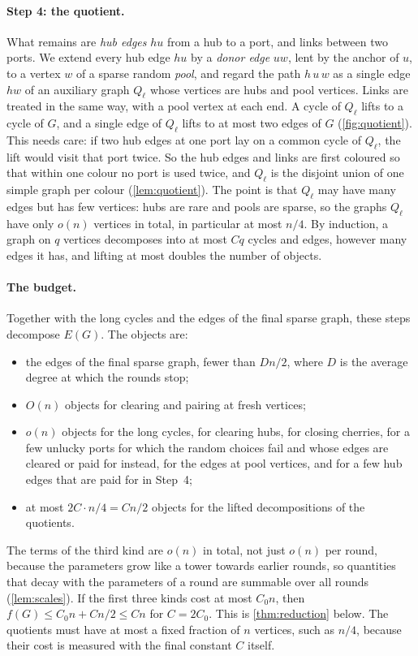 \documentclass[11pt]{article}
\theoremstyle{definition}
\theoremstyle{remark}
\numberwithin{equation}{section}
\numberwithin{figure}{section}
\numberwithin{table}{section}
\begin{document}
\paragraph{Step 4: the quotient.} What remains are \emph{hub edges} $hu$ from a
hub to a port, and links between two ports. We extend every hub edge $hu$ by a
\emph{donor edge} $uw$, lent by the anchor of $u$, to a vertex $w$ of a sparse random
\emph{pool}, and regard the path $h\,u\,w$ as a single edge $hw$ of an auxiliary
graph $Q_\ell$ whose vertices are hubs and pool vertices. Links are treated in
the same way, with a pool vertex at each end. A cycle of $Q_\ell$ lifts to a
cycle of $G$, and a single edge of $Q_\ell$ lifts to at most two edges of $G$
(\cref{fig:quotient}). This needs care: if two hub edges at one port lay on a
common cycle of $Q_\ell$, the lift would visit that port twice. So the hub
edges and links are first coloured so that within one colour no port is used
twice, and $Q_\ell$ is the disjoint union of one simple graph per colour
(\cref{lem:quotient}). The point is that $Q_\ell$ may have many edges but has
few vertices: hubs are rare and pools are sparse, so the graphs $Q_\ell$ have
only $o(n)$ vertices in total, in particular at most $n/4$. By induction, a graph on $q$ vertices decomposes
into at most $Cq$ cycles and edges, however many edges it has, and lifting at
most doubles the number of objects.

\paragraph{The budget.} Together with the long cycles and the edges of the
final sparse graph, these steps decompose $E(G)$. The objects are:
\begin{itemize}[leftmargin=2em,itemsep=1pt]
\item the edges of the final sparse graph, fewer than $Dn/2$, where $D$ is the
average degree at which the rounds stop;
\item $O(n)$ objects for clearing and pairing at fresh vertices;
\item $o(n)$ objects for the long cycles, for clearing hubs, for closing
cherries, for a few unlucky ports for which the random choices fail and whose
edges are cleared or paid for instead, for the edges at pool vertices, and for
a few hub edges that are paid for in Step~4;
\item at most $2C\cdot n/4=Cn/2$ objects for the lifted decompositions of the
quotients.
\end{itemize}
The terms of the third kind are $o(n)$ in total, not just $o(n)$ per round,
because the parameters grow like a tower towards earlier rounds, so quantities
that decay with the parameters of a round are summable over all rounds
(\cref{lem:scales}). If the first three kinds cost at most $C_0n$, then
$f(G)\le C_0n+Cn/2\le Cn$ for $C=2C_0$. This is \cref{thm:reduction} below.
The quotients must have at most a fixed fraction of $n$ vertices, such as
$n/4$, because their cost is measured with the final constant $C$ itself.
\end{document}
